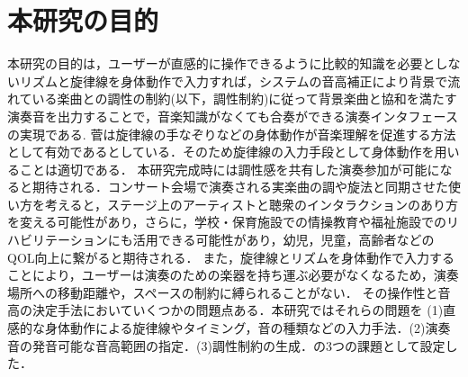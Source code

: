 \section{本研究の目的}
本研究の目的は，ユーザーが直感的に操作できるように比較的知識を必要としないリズムと旋律線を身体動作で入力すれば，システムの音高補正により背景で流れている楽曲との調性の制約(以下，調性制約)に従って背景楽曲と協和を満たす演奏音を出力することで，音楽知識がなくても合奏ができる演奏インタフェースの実現である. 菅\cite{suga2008}は旋律線の手なぞりなどの身体動作が音楽理解を促進する方法として有効であるとしている．そのため旋律線の入力手段として身体動作を用いることは適切である．
本研究完成時には調性感を共有した演奏参加が可能になると期待される．コンサート会場で演奏される実楽曲の調や旋法と同期させた使い方を考えると，ステージ上のアーティストと聴衆のインタラクションのあり方を変える可能性があり，さらに，学校・保育施設での情操教育や福祉施設でのリハビリテーションにも活用できる可能性があり，幼児，児童，高齢者などのQOL向上に繋がると期待される．
また，旋律線とリズムを身体動作で入力することにより，ユーザーは演奏のための楽器を持ち運ぶ必要がなくなるため，演奏場所への移動距離や，スペースの制約に縛られることがない．
その操作性と音高の決定手法においていくつかの問題点ある．本研究ではそれらの問題を
(1)直感的な身体動作による旋律線やタイミング，音の種類などの入力手法．(2)演奏音の発音可能な音高範囲の指定．(3)調性制約の生成．の3つの課題として設定した．

